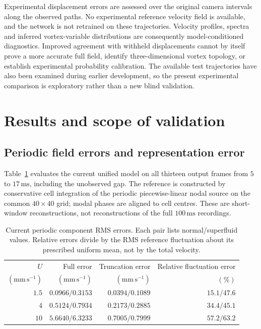 \documentclass[11pt]{article}
\numberwithin{equation}{section}
\begin{document}
Experimental displacement errors are assessed over the original camera intervals along the observed paths. No experimental reference velocity field is available, and the network is not retrained on these trajectories. Velocity profiles, spectra and inferred vortex-variable distributions are consequently model-conditioned diagnostics. Improved agreement with withheld displacements cannot by itself prove a more accurate full field, identify three-dimensional vortex topology, or establish experimental probability calibration. The available test trajectories have also been examined during earlier development, so the present experimental comparison is exploratory rather than a new blind validation.

\section{Results and scope of validation}
\label{sec:results}

\subsection{Periodic field errors and representation error}

Table~\ref{tab:currenterrors} evaluates the current unified model on all thirteen output frames from $5$ to $17\,\mathrm{ms}$, including the unobserved gap. The reference is constructed by conservative cell integration of the periodic piecewise-linear nodal source on the common $40\times40$ grid; modal phases are aligned to cell centres. These are short-window reconstructions, not reconstructions of the full $100\,\mathrm{ms}$ recordings.
\begin{table}[htbp]
 \centering
 \caption{Current periodic component RMS errors. Each pair lists normal/superfluid values. Relative errors divide by the RMS reference fluctuation about its prescribed uniform mean, not by the total velocity.}
 \label{tab:currenterrors}
 \begin{tabular}{rrrr}
 \toprule
 $U$ & Full error & Truncation error & Relative fluctuation error\\
 $(\mathrm{mm\,s^{-1}})$ & $(\mathrm{mm\,s^{-1}})$ & $(\mathrm{mm\,s^{-1}})$ & $(\%)$\\
 \midrule
 $1.5$ & $0.0966/0.3153$ & $0.0394/0.1089$ & $15.1/47.6$\\
 $4$   & $0.5124/0.7934$ & $0.2173/0.2885$ & $34.4/45.1$\\
 $10$  & $5.6640/6.3233$ & $0.7005/0.7999$ & $57.2/63.2$\\
 \bottomrule
 \end{tabular}
\end{table}
\end{document}
